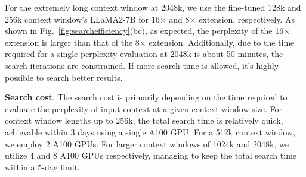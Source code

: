 \documentclass{article}
\theoremstyle{plain}
\theoremstyle{definition}
\theoremstyle{remark}
\begin{document}
For the extremely long context window at 2048k, we use the fine-tuned 128k and 256k context window's LLaMA2-7B for 16$\times$ and 8$\times$ extension, respectively. As shown in Fig.~\ref{fig:searchefficiency}(bc), as expected, the perplexity of the 16$\times$ extension is larger than that of the 8$\times$ extension. Additionally, due to the time required for a single perplexity evaluation at 2048k is about 50 minutes, the search iterations are constrained. If more search time is allowed, it's highly possible to search better results.  

\noindent\textbf{Search cost}. The search cost is primarily depending on the time required to evaluate the perplexity of input context at a given context window size. For context window lengths up to 256k, the total search time is relatively quick, achievable within 3 days using a single A100 GPU. For a 512k context window, we employ 2 A100 GPUs. For larger context windows of 1024k and 2048k, we utilize 4 and 8 A100 GPUs respectively, managing to keep the total search time within a 5-day limit.
\end{document}
